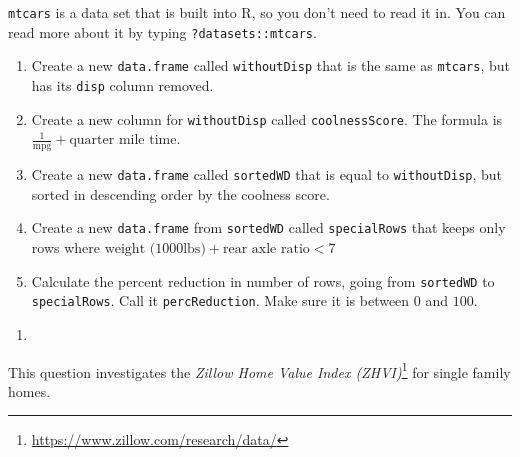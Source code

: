 \documentclass[
  12pt,
  krantz2]{krantz}
\providecommand{\tightlist}{%
  \setlength{\itemsep}{0pt}\setlength{\parskip}{0pt}}
\renewcommand{\href}[2]{#2\footnote{\url{#1}}}
\begin{document}
\texttt{mtcars} is a data set that is built into R, so you don't need to read it in. You can read more about it by typing \texttt{?datasets::mtcars}.

\begin{enumerate}
\def\labelenumi{\alph{enumi})}
\tightlist
\item
  Create a new \texttt{data.frame} called \texttt{withoutDisp} that is the same as \texttt{mtcars}, but has its \texttt{disp} column removed.
\item
  Create a new column for \texttt{withoutDisp} called \texttt{coolnessScore}. The formula is \(\frac{1}{\text{mpg}} + \text{quarter mile time}\).
\item
  Create a new \texttt{data.frame} called \texttt{sortedWD} that is equal to \texttt{withoutDisp}, but sorted in descending order by the coolness score.
\item
  Create a new \texttt{data.frame} from \texttt{sortedWD} called \texttt{specialRows} that keeps only rows where \(\text{weight (1000lbs)} + \text{rear axle ratio} < 7\)
\item
  Calculate the percent reduction in number of rows, going from \texttt{sortedWD} to \texttt{specialRows}. Call it \texttt{percReduction}. Make sure it is between \(0\) and \(100\).
\end{enumerate}

\begin{enumerate}
\def\labelenumi{\arabic{enumi}.}
\setcounter{enumi}{2}
\tightlist
\item
\end{enumerate}

This question investigates the \href{https://www.zillow.com/research/data/}{\emph{Zillow Home Value Index (ZHVI)}} for single family homes.
\end{document}
